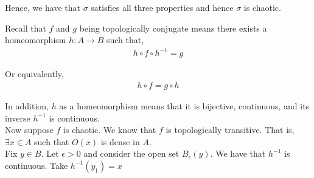 \documentclass[12pt]{article}
\newenvironment{problem}[2][Problem]{\begin{trivlist}
\item[\hskip \labelsep {\bfseries #1}\hskip \labelsep {\bfseries #2.}]}{\end{trivlist}}
\begin{document}
Hence, we have that $\sigma$ satisfies all three properties and hence $\sigma$ is chaotic.

\begin{problem}{2}
\end{problem}

Recall that $f$ and $g$ being topologically conjugate means there exists a homeomorphism $h: A \to B$ such that,
\begin{align*}
h \circ f \circ h^{-1} = g
\end{align*}

Or equivalently,
\begin{align*}
h \circ f = g \circ h
\end{align*}

In addition, $h$ as a homeomorphism means that it is bijective, continuous, and its inverse $h^{-1}$ is continuous.\\

Now suppose $f$ is chaotic. We know that $f$ is topologically transitive. That is, $\exists x \in A$ such that $O(x)$ is dense in $A$.\\

Fix $y \in B$. Let $\epsilon > 0$ and consider the open set $B_{\epsilon}(y)$. We have that $h^{-1}$ is continuous. Take $h^{-1}(y_1) = x$

\begin{problem}{3}
\end{problem}

\begin{problem}{4}
\end{problem}
\end{document}
